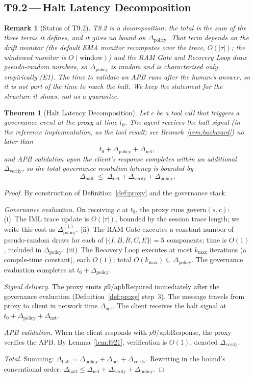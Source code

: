 \documentclass[11pt]{article}
\newtheorem{theorem}{Theorem}[section]
\newtheorem{remark}{Remark}[section]
\newcommand{\Dnet}{\Delta_{\mathrm{net}}}
\newcommand{\Dverify}{\Delta_{\mathrm{verify}}}
\newcommand{\Dpolicy}{\Delta_{\mathrm{policy}}}
\begin{document}
\subsection{T9.2\,---\,Halt Latency Decomposition}
\label{sec:t92}

\begin{remark}[Status of T9.2]
T9.2 is a \emph{decomposition}: the total is the sum of the three terms
it defines, and it gives no bound on $\Dpolicy$. That term depends on
the drift monitor (the default EMA monitor recomputes over the trace,
$O(|\tau|)$; the windowed monitor is $O(\text{window})$) and the RAM
Gate and Recovery Loop draw pseudo-random numbers, so $\Dpolicy$ is
random and is characterised only empirically (E1). The time to
\emph{validate} an APB runs after the human's answer, so it is not part
of the time to reach the halt. We keep the statement for the structure it
shows, not as a guarantee.
\end{remark}

\begin{theorem}[Halt Latency Decomposition]
\label{thm:latency}
Let $c$ be a tool call that triggers a governance event at the proxy
at time $t_0$. The agent receives the halt signal (in the reference
implementation, as the tool result; see Remark~\ref{rem:backward}) no later than
\[
  t_0 + \Dpolicy + \Dnet,
\]
and APB validation upon the client's response completes within an
additional $\Dverify$, so the total governance resolution latency is
bounded by
\[
  \Delta_\text{halt} \;\leq\; \Dnet + \Dverify + \Dpolicy.
\]
\end{theorem}

\begin{proof}
By construction of Definition~\ref{def:proxy} and the governance stack.

\emph{Governance evaluation.}
On receiving $c$ at $t_0$, the proxy runs $\mathrm{govern}(s, c)$:
(i)~The IML trace update is $O(|\tau|)$, bounded by the session trace
length; we write this cost as $\Dpolicy^{(1)}$.
(ii)~The RAM Gate executes a constant number of pseudo-random draws
for each of $|\{I,B,R,C,E\}| = 5$ components; time is $O(1)$, included
in $\Dpolicy$.
(iii)~The Recovery Loop executes at most $k_\text{max}$ iterations
(a compile-time constant), each $O(1)$; total $O(k_\text{max})
\subseteq \Dpolicy$.
The governance evaluation completes at $t_0 + \Dpolicy$.

\emph{Signal delivery.}
The proxy emits $p9/\mathrm{apbRequired}$ immediately after the
governance evaluation (Definition~\ref{def:proxy} step~3).
The message travels from proxy to client in network time $\Dnet$.
The client receives the halt signal at $t_0 + \Dpolicy + \Dnet$.

\emph{APB validation.}
When the client responds with $p9/\mathrm{apbResponse}$, the proxy
verifies the APB. By Lemma~\ref{lem:l921}, verification is $O(1)$,
denoted $\Dverify$.

\emph{Total.}
Summing: $\Delta_\text{halt} = \Dpolicy + \Dnet + \Dverify$.
Rewriting in the bound's conventional order:
$\Delta_\text{halt} \leq \Dnet + \Dverify + \Dpolicy$.
\end{proof}
\end{document}
